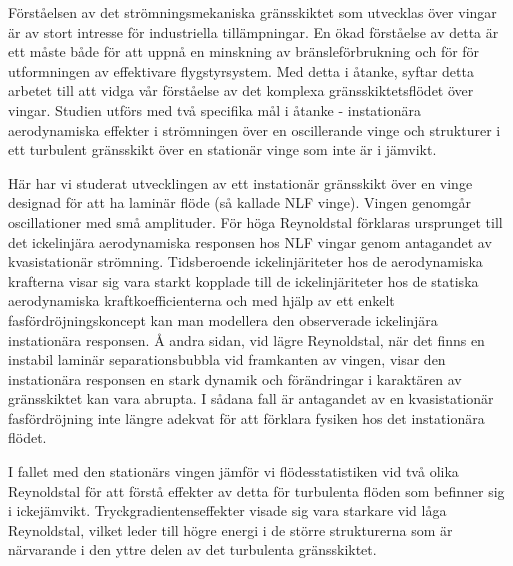 %
\begin{abstrakt}
	Förståelsen av det strömningsmekaniska gränsskiktet som utvecklas över vingar är av stort intresse för industriella tillämpningar. En ökad förståelse av detta är ett måste både för att uppnå en minskning av bränsleförbrukning och för för utformningen av effektivare flygstyrsystem. Med detta i åtanke, syftar detta arbetet till att vidga vår förståelse av det komplexa gränsskiktetsflödet över vingar. Studien utförs med två specifika mål i åtanke - instationära aerodynamiska effekter i strömningen över en oscillerande vinge och strukturer i ett turbulent gränsskikt över en stationär vinge som inte är i jämvikt.
	
	Här har vi studerat utvecklingen av ett instationär gränsskikt över en vinge designad för att ha laminär flöde (så kallade NLF vinge). Vingen genomgår oscillationer med små amplituder. För höga Reynoldstal förklaras ursprunget till det ickelinjära aerodynamiska responsen hos NLF vingar genom antagandet av kvasistationär strömning. Tidsberoende ickelinjäriteter hos de aerodynamiska krafterna visar sig vara starkt kopplade till de ickelinjäriteter hos de statiska aerodynamiska kraftkoefficienterna och med hjälp av ett enkelt fasfördröjningskoncept kan man modellera den observerade ickelinjära instationära responsen. Å andra sidan, vid lägre Reynoldstal, när det finns en instabil laminär separationsbubbla vid framkanten av vingen, visar den instationära responsen en stark dynamik och förändringar i karaktären av gränsskiktet kan vara abrupta. I sådana fall är antagandet av en kvasistationär fasfördröjning inte längre adekvat för att förklara fysiken hos det instationära flödet.
	
	I fallet med den stationärs vingen jämför vi flödesstatistiken vid två olika Reynoldstal för att förstå effekter av detta för turbulenta flöden som befinner sig i ickejämvikt. Tryckgradientenseffekter visade sig vara starkare vid låga Reynoldstal, vilket leder till högre energi i de större strukturerna som är närvarande i den yttre delen av det turbulenta gränsskiktet.
\end{abstrakt}


